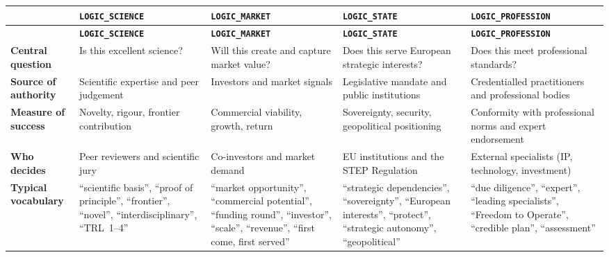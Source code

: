 \begin{longtable}{@{} p{2.4cm} p{2.6cm} p{2.6cm} p{2.6cm} p{2.6cm} @{}}
\toprule
& \textbf{\texttt{LOGIC\_SCIENCE}} & \textbf{\texttt{LOGIC\_MARKET}} & \textbf{\texttt{LOGIC\_STATE}} & \textbf{\texttt{LOGIC\_PROFESSION}} \\
\midrule
\endfirsthead
\toprule
& \textbf{\texttt{LOGIC\_SCIENCE}} & \textbf{\texttt{LOGIC\_MARKET}} & \textbf{\texttt{LOGIC\_STATE}} & \textbf{\texttt{LOGIC\_PROFESSION}} \\
\midrule
\endhead
\bottomrule
\endfoot
{\footnotesize\textbf{Central question}} & {\footnotesize Is this excellent science?} & {\footnotesize Will this create and capture market value?} & {\footnotesize Does this serve European strategic interests?} & {\footnotesize Does this meet professional standards?} \\
\addlinespace
{\footnotesize\textbf{Source of authority}} & {\footnotesize Scientific expertise and peer judgement} & {\footnotesize Investors and market signals} & {\footnotesize Legislative mandate and public institutions} & {\footnotesize Credentialled practitioners and professional bodies} \\
\addlinespace
{\footnotesize\textbf{Measure of success}} & {\footnotesize Novelty, rigour, frontier contribution} & {\footnotesize Commercial viability, growth, return} & {\footnotesize Sovereignty, security, geopolitical positioning} & {\footnotesize Conformity with professional norms and expert endorsement} \\
\addlinespace
{\footnotesize\textbf{Who decides}} & {\footnotesize Peer reviewers and scientific jury} & {\footnotesize Co-investors and market demand} & {\footnotesize EU institutions and the STEP Regulation} & {\footnotesize External specialists (IP, technology, investment)} \\
\addlinespace
{\footnotesize\textbf{Typical vocabulary}} & {\footnotesize \enquote{scientific basis}, \enquote{proof of principle}, \enquote{frontier}, \enquote{novel}, \enquote{interdisciplinary}, \enquote{TRL~1--4}} & {\footnotesize \enquote{market opportunity}, \enquote{commercial potential}, \enquote{funding round}, \enquote{investor}, \enquote{scale}, \enquote{revenue}, \enquote{first come, first served}} & {\footnotesize \enquote{strategic dependencies}, \enquote{sovereignty}, \enquote{European interests}, \enquote{protect}, \enquote{strategic autonomy}, \enquote{geopolitical}} & {\footnotesize \enquote{due diligence}, \enquote{expert}, \enquote{leading specialists}, \enquote{Freedom to Operate}, \enquote{credible plan}, \enquote{assessment}} \\

\end{longtable}
